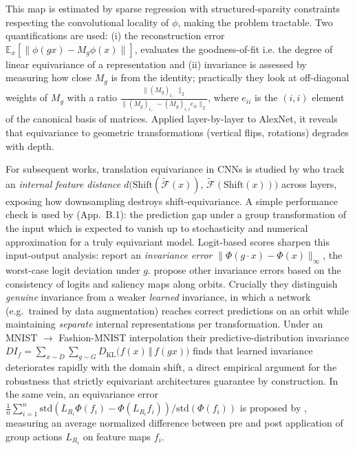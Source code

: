 \documentclass[mathematics,review,submit,moreauthors]{Definitions/mdpi}
\begin{document}
This map is estimated by sparse regression with structured-sparsity constraints respecting the convolutional locality of $\phi$, making the problem tractable.
Two quantifications are used: (i) the reconstruction error $\mathbb E_x[\|\phi(gx)-M_g\phi(x)\|]$, evaluates the goodness-of-fit i.e. the degree of linear equivariance of a representation and (ii) invariance is assessed by measuring how close $M_g$ is from the identity; practically they look at off-diagonal weights of $M_g$ with a ratio $\frac{\|(M_g)_{i,:}\|_2}{\|(M_g)_{i,:}-(M_g)_{i,i}e_{ii}\|_2}$, where $e_{ii}$ is the $(i,i)$ element of the canonical basis of matrices.
Applied layer-by-layer to AlexNet, it reveals that equivariance to geometric transformations (vertical flips, rotations) degrades with depth.

For subsequent works, translation equivariance in CNNs is studied by \citet{zhang2019p3icml} who track an \emph{internal feature distance} $d\big(\mathrm{Shift}(\widetilde{\mathcal{F}}(x)),\,\widetilde{\mathcal{F}}(\mathrm{Shift}(x))\big)$ across layers, exposing how downsampling destroys shift-equivariance.
A simple performance check is used by \citet{finzi2020p3icml} (App.~B.1): the prediction gap under a group transformation of the input which is expected to vanish up to stochasticity and numerical approximation for a truly equivariant model.
Logit-based scores sharpen this input-output analysis: \citet{hutchinson2021p3icml} report an \emph{invariance error} $\lVert \Phi(g\cdot x) - \Phi(x)\rVert_\infty$, the worst-case logit deviation under $g$.
\citet{moskalev2023p2awtagmlt} propose other invariance errors based on the consistency of logits and saliency maps along orbits.
Crucially they distinguish \emph{genuine} invariance from a weaker \emph{learned} invariance, in which a network (e.g.\ trained by data augmentation) reaches correct predictions on an orbit while maintaining \emph{separate} internal representations per transformation.
Under an MNIST $\to$ Fashion-MNIST interpolation their predictive-distribution invariance $DI_f = \sum_{x\sim D}\sum_{g\sim G} D_{\mathrm{KL}}\big(f(x)\,\Vert\,f(gx)\big)$ finds that learned invariance deteriorates rapidly with the domain shift, a direct empirical argument for the robustness that strictly equivariant architectures guarantee by construction.
In the same vein, an equivariance error $\frac{1}{n} \sum_{i=1}^{n} \text{std}(L_{R_i} \Phi(f_i) - \Phi(L_{R_i} f_i)) / \text{std}(\Phi(f_i))$ is proposed by \citet{cohen2018}, measuring an average normalized difference between pre and post application of group actions $L_{R_i}$ on feature maps $f_i$.
\end{document}
